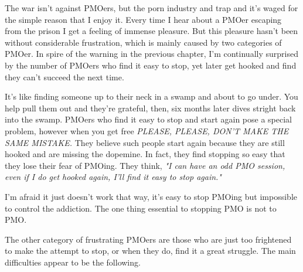 \documentclass[easypeasy.tex]{subfiles}
\begin{document}
The war isn't against PMOers, but the porn industry and trap and it's waged for the simple reason that I enjoy it. Every time I hear about a PMOer escaping from the prison I get a feeling of immense pleasure. But this pleasure hasn't been without considerable frustration, which is mainly caused by two categories of PMOer. In spire of the warning in the previous chapter, I'm continually surprised by the number of PMOers who find it easy to stop, yet later get hooked and find they can't succeed the next time.

It's like finding someone up to their neck in a swamp and about to go under. You help pull them out and they're grateful, then, six months later dives stright back into the swamp. PMOers who find it easy to stop and start again pose a special problem, however when you get free \textit{PLEASE, PLEASE, DON'T MAKE THE SAME MISTAKE.} They believe such people start again because they are still hooked and are missing the dopemine. In fact, they find stopping so easy that they lose their fear of PMOing. They think, \textit{"I can have an odd PMO session, even if I do get hooked again, I'll find it easy to stop again."}

I'm afraid it just doesn't work that way, it's easy to stop PMOing but impossible to control the addiction. The one thing essential to stopping PMO is not to PMO. 

The other category of frustrating PMOers are those who are just too frightened to make the attempt to stop, or when they do, find it a great struggle. The main difficulties appear to be the following.
\end{document}
